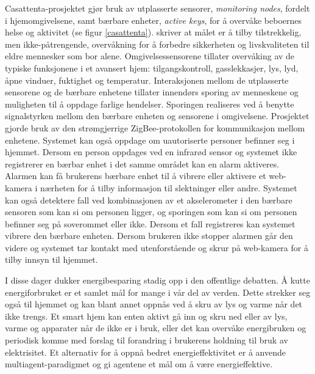 {Casattenta-prosjektet gjør bruk av utplasserte sensorer, \emph{monitoring nodes}, fordelt i hjemomgivelsene, samt bærbare enheter, \emph{active keys}, for å overvåke beboernes helse og aktivitet (se figur \ref{casattenta}). \citet{casattenta} skriver at målet er å tilby tilstrekkelig, men ikke-påtrengende, overvåkning for å forbedre sikkerheten og livskvaliteten til eldre mennesker som bor alene. Omgivelsessensorene tillater overvåking av de typiske funksjonene i et avansert hjem: tilgangskontroll, gasslekkasjer, lys, lyd, åpne vinduer, fuktighet og temperatur. Interaksjonen mellom de utplasserte sensorene og de bærbare enhetene tillater innendørs sporing av menneskene og muligheten til å oppdage farlige hendelser. Sporingen realiseres ved å benytte signalstyrken mellom den bærbare enheten og sensorene i omgivelsene. Prosjektet gjorde bruk av den strømgjerrige ZigBee-protokollen for kommunikasjon mellom enhetene. Systemet kan også oppdage om uautoriserte personer befinner seg i hjemmet. Dersom en person oppdages ved en infrarød sensor og systemet ikke registrerer en bærbar enhet i det samme området kan en alarm aktiveres. Alarmen kan få brukerens bærbare enhet til å vibrere eller aktivere et web-kamera i nærheten for å tilby informasjon til slektninger eller andre. Systemet kan også detektere fall ved kombinasjonen av et akselerometer i den bærbare sensoren som kan si om personen ligger, og sporingen som kan si om personen befinner seg på soverommet eller ikke. Dersom et fall registreres kan systemet vibrere den bærbare enheten. Dersom brukeren ikke stopper alarmen går den videre og systemet tar kontakt med utenforstående og skrur på web-kamera for å tilby innsyn til hjemmet.

I disse dager dukker energibesparing stadig opp i den offentlige debatten. Å kutte energiforbruket er et samlet mål for mange i vår del av verden. Dette strekker seg også til hjemmet og kan blant annet oppnås ved å skru av lys og varme når det ikke trengs. Et smart hjem kan enten aktivt gå inn og skru ned eller av lys, varme og apparater når de ikke er i bruk, eller det kan overvåke energibruken og periodisk komme med forslag til forandring i brukerens holdning til bruk av elektrisitet. Et alternativ for å oppnå bedret energieffektivitet er å anvende multiagent-paradigmet og gi agentene et mål om å være energieffektive.

}
